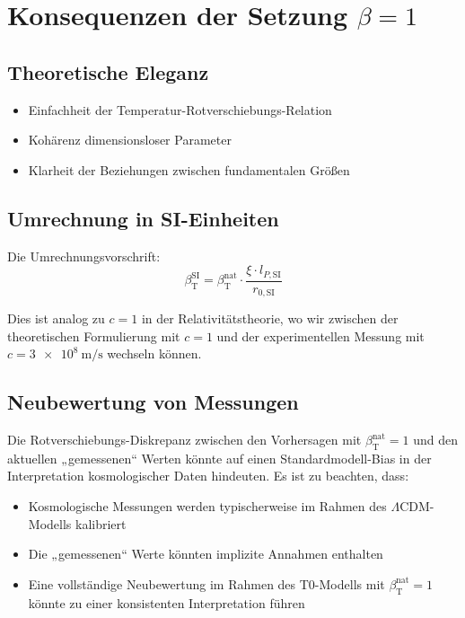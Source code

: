 \documentclass[12pt,a4paper]{article}
\newcommand{\betaT}{\beta_{\text{T}}}
\begin{document}
	\section{Konsequenzen der Setzung \(\beta = 1\)}
	
	\subsection{Theoretische Eleganz}
	
	\begin{itemize}
		\item Einfachheit der Temperatur-Rotverschiebungs-Relation
		\item Kohärenz dimensionsloser Parameter
		\item Klarheit der Beziehungen zwischen fundamentalen Größen
	\end{itemize}
	
	\subsection{Umrechnung in SI-Einheiten}
	
	Die Umrechnungsvorschrift:
	\begin{equation}
		\betaT^{\text{SI}} = \betaT^{\text{nat}} \cdot \frac{\xi \cdot l_{P,\text{SI}}}{r_{0,\text{SI}}}
	\end{equation}
	
	Dies ist analog zu \(c = 1\) in der Relativitätstheorie, wo wir zwischen der theoretischen Formulierung mit \(c = 1\) und der experimentellen Messung mit \(c = \SI{3e8}{\meter\per\second}\) wechseln können.
	
	\subsection{Neubewertung von Messungen}
	
	Die Rotverschiebungs-Diskrepanz zwischen den Vorhersagen mit \(\betaT^{\text{nat}} = 1\) und den aktuellen „gemessenen“ Werten könnte auf einen Standardmodell-Bias in der Interpretation kosmologischer Daten hindeuten. Es ist zu beachten, dass:
	\begin{itemize}
		\item Kosmologische Messungen werden typischerweise im Rahmen des \(\Lambda\)CDM-Modells kalibriert
		\item Die „gemessenen“ Werte könnten implizite Annahmen enthalten
		\item Eine vollständige Neubewertung im Rahmen des T0-Modells mit \(\betaT^{\text{nat}} = 1\) könnte zu einer konsistenten Interpretation führen
	\end{itemize}
	
\end{document}
